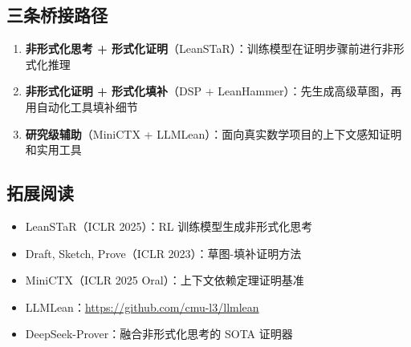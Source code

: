 \documentclass[a4paper]{article}
\begin{document}
\subsection{三条桥接路径}

\begin{enumerate}
    \item \textbf{非形式化思考 + 形式化证明}（LeanSTaR）：训练模型在证明步骤前进行非形式化推理
    \item \textbf{非形式化证明 + 形式化填补}（DSP + LeanHammer）：先生成高级草图，再用自动化工具填补细节
    \item \textbf{研究级辅助}（MiniCTX + LLMLean）：面向真实数学项目的上下文感知证明和实用工具
\end{enumerate}

\subsection{拓展阅读}
\begin{itemize}
    \item LeanSTaR（ICLR 2025）：RL 训练模型生成非形式化思考
    \item Draft, Sketch, Prove（ICLR 2023）：草图-填补证明方法
    \item MiniCTX（ICLR 2025 Oral）：上下文依赖定理证明基准
    \item LLMLean：\url{https://github.com/cmu-l3/llmlean}
    \item DeepSeek-Prover：融合非形式化思考的 SOTA 证明器
\end{itemize}
\end{document}
